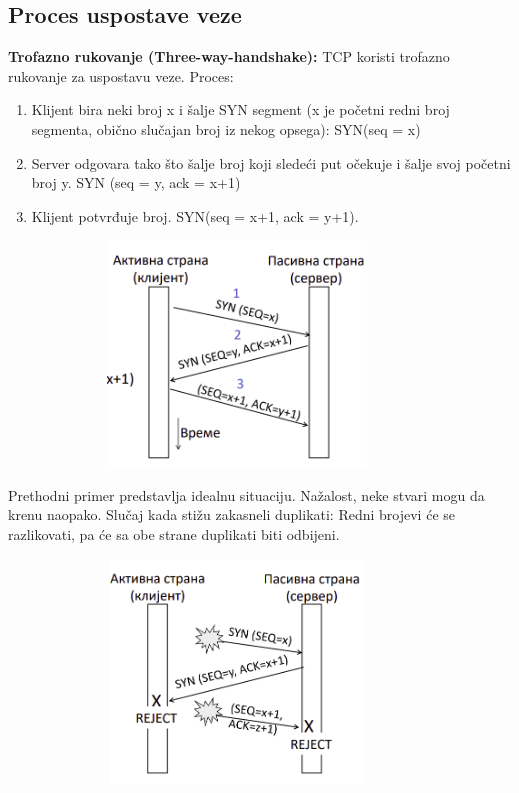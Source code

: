 \documentclass[a4paper]{article}
\begin{document}
    \subsection{Proces uspostave veze}
        \textbf{Trofazno rukovanje (Three-way-handshake):} TCP koristi trofazno rukovanje za 
        uspostavu veze. Proces:
        \begin{enumerate}
            \item Klijent bira neki broj x i šalje SYN segment (x je početni redni 
                  broj segmenta, obično slučajan broj iz nekog opsega): SYN(seq = x)
            \item Server odgovara tako što šalje broj koji sledeći put očekuje i šalje 
                  svoj početni broj y. SYN (seq = y, ack = x+1)
            \item Klijent potvrđuje broj. SYN(seq = x+1, ack = y+1).
        \end{enumerate}
        \begin{figure}[H]
            \begin{center}
                \includegraphics[width=100mm,height=60mm]{Slike/uspostava_konekcije1.png}
            \end{center}
        \end{figure}
        Prethodni primer predstavlja idealnu situaciju. Nažalost, neke stvari mogu da krenu naopako.
        Slučaj kada stižu zakasneli duplikati: Redni brojevi će se razlikovati, pa će sa obe strane
        duplikati biti odbijeni.
        \begin{figure}[H]
            \begin{center}
                \includegraphics[width=100mm,height=60mm]{Slike/uspostava_konekcije2.png}
            \end{center}
        \end{figure}
\end{document}
